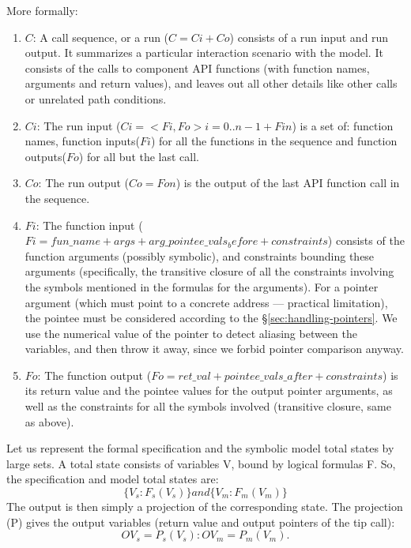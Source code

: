 \documentclass[letterpaper,twocolumn,10pt]{article}
\begin{document}
More formally:
\begin{enumerate}
    \item \(C\): A call sequence, or a run (\(C=Ci+Co\)) consists of a run input and run output. It summarizes a particular interaction scenario with the model. It consists of the calls to component API functions (with function names, arguments and return values), and leaves out all other details like other calls or unrelated path conditions.
    \item \(Ci\): The run input (\(Ci = <Fi,Fo>i=0..n-1 + Fin\)) is a set of: function names, function inputs(\(Fi\)) for all the functions in the sequence and function outputs(\(Fo\)) for all but the last call.
    \item \(Co\): The run output (\(Co = Fon\)) is the output of the last API function call in the sequence.
    \item \(Fi\): The function input (\(Fi = fun\_name + args + arg\_pointee\_vals_before + constraints\)) consists of the function arguments (possibly symbolic), and constraints bounding these arguments (specifically, the transitive closure of all the constraints involving the symbols mentioned in the formulas for the arguments). For a pointer argument (which must point to a concrete address --- practical limitation), the pointee must be considered according to the \S\ref{sec:handling-pointers}. We use the numerical value of the pointer to detect aliasing between the variables, and then throw it away, since we forbid pointer comparison anyway.
    \item \(Fo\): The function output (\(Fo = ret\_val + pointee\_vals\_after + constraints\)) is its return value and the pointee values for the output pointer arguments, as well as the constraints for all the symbols involved (transitive closure, same as above).
\end{enumerate}

Let us represent the formal specification and the symbolic model total states by large sets. A total state consists of variables V, bound by logical formulas F. So, the specification and model total states are:
\[
\{V_s : F_s(V_s)\} and \{V_m : F_m(V_m)\}
\]
The output is then simply a projection of the corresponding state. The projection (P) gives the output variables (return value and output pointers of the tip call): 
\[
OV_s = P_s(V_s): OV_m = P_m(V_m).
\]
\end{document}
